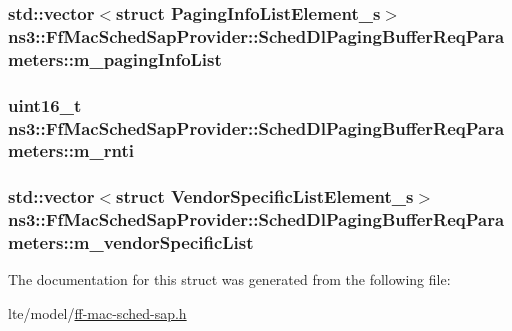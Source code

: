 \subsubsection[{\texorpdfstring{m\+\_\+paging\+Info\+List}{m_pagingInfoList}}]{\setlength{\rightskip}{0pt plus 5cm}std\+::vector$<$struct {\bf Paging\+Info\+List\+Element\+\_\+s}$>$ ns3\+::\+Ff\+Mac\+Sched\+Sap\+Provider\+::\+Sched\+Dl\+Paging\+Buffer\+Req\+Parameters\+::m\+\_\+paging\+Info\+List}\hypertarget{structns3_1_1FfMacSchedSapProvider_1_1SchedDlPagingBufferReqParameters_aec82518f050a26f9bc201769d8878a0a}{}\label{structns3_1_1FfMacSchedSapProvider_1_1SchedDlPagingBufferReqParameters_aec82518f050a26f9bc201769d8878a0a}
\subsubsection[{\texorpdfstring{m\+\_\+rnti}{m_rnti}}]{\setlength{\rightskip}{0pt plus 5cm}uint16\+\_\+t ns3\+::\+Ff\+Mac\+Sched\+Sap\+Provider\+::\+Sched\+Dl\+Paging\+Buffer\+Req\+Parameters\+::m\+\_\+rnti}\hypertarget{structns3_1_1FfMacSchedSapProvider_1_1SchedDlPagingBufferReqParameters_a5b1c736b03afd80148570e019e07d18e}{}\label{structns3_1_1FfMacSchedSapProvider_1_1SchedDlPagingBufferReqParameters_a5b1c736b03afd80148570e019e07d18e}
\subsubsection[{\texorpdfstring{m\+\_\+vendor\+Specific\+List}{m_vendorSpecificList}}]{\setlength{\rightskip}{0pt plus 5cm}std\+::vector$<$struct {\bf Vendor\+Specific\+List\+Element\+\_\+s}$>$ ns3\+::\+Ff\+Mac\+Sched\+Sap\+Provider\+::\+Sched\+Dl\+Paging\+Buffer\+Req\+Parameters\+::m\+\_\+vendor\+Specific\+List}\hypertarget{structns3_1_1FfMacSchedSapProvider_1_1SchedDlPagingBufferReqParameters_a9a404b3115872ade0306ae62c4821a4c}{}\label{structns3_1_1FfMacSchedSapProvider_1_1SchedDlPagingBufferReqParameters_a9a404b3115872ade0306ae62c4821a4c}


The documentation for this struct was generated from the following file\+:\begin{DoxyCompactItemize}
\item 
lte/model/\hyperlink{ff-mac-sched-sap_8h}{ff-\/mac-\/sched-\/sap.\+h}\end{DoxyCompactItemize}
